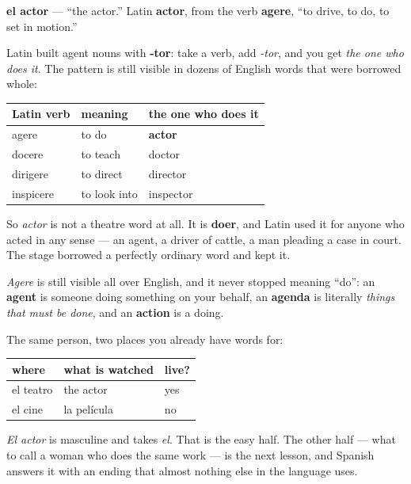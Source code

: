 \begin{cousinweb}
\textbf{el actor} — \textquotedblleft{}the actor.\textquotedblright{} Latin \textbf{actor}, from the verb \textbf{agere}, \textquotedblleft{}to drive, to do, to set in motion.\textquotedblright{}

Latin built agent nouns with \textbf{-tor}: take a verb, add \emph{-tor}, and you get \emph{the one who does it}. The pattern is still visible in dozens of English words that were borrowed whole:

\noindent
\begin{tabularx}{\linewidth}{@{}>{\raggedright\arraybackslash}X>{\raggedright\arraybackslash}X>{\raggedright\arraybackslash}X@{}}
\toprule
\textbf{Latin verb} & \textbf{meaning} & \textbf{the one who does it} \\
\midrule
agere & to do & \textbf{actor} \\
docere & to teach & doctor \\
dirigere & to direct & director \\
inspicere & to look into & inspector \\
\bottomrule
\end{tabularx}

So \emph{actor} is not a theatre word at all. It is \textbf{doer}, and Latin used it for anyone who acted in any sense — an agent, a driver of cattle, a man pleading a case in court. The stage borrowed a perfectly ordinary word and kept it.

\emph{Agere} is still visible all over English, and it never stopped meaning \textquotedblleft{}do\textquotedblright{}: an \textbf{agent} is someone doing something on your behalf, an \textbf{agenda} is literally \emph{things that must be done}, and an \textbf{action} is a doing.
\end{cousinweb}

\begin{grammarlens}[title={Grammar Lens: the two workplaces}]
The same person, two places you already have words for:

\noindent
\begin{tabularx}{\linewidth}{@{}>{\raggedright\arraybackslash}X>{\raggedright\arraybackslash}X>{\raggedright\arraybackslash}X@{}}
\toprule
\textbf{where} & \textbf{what is watched} & \textbf{live?} \\
\midrule
el teatro & the actor & yes \\
el cine & la película & no \\
\bottomrule
\end{tabularx}

\emph{El actor} is masculine and takes \emph{el}. That is the easy half. The other half — what to call a woman who does the same work — is the next lesson, and Spanish answers it with an ending that almost nothing else in the language uses.
\end{grammarlens}

